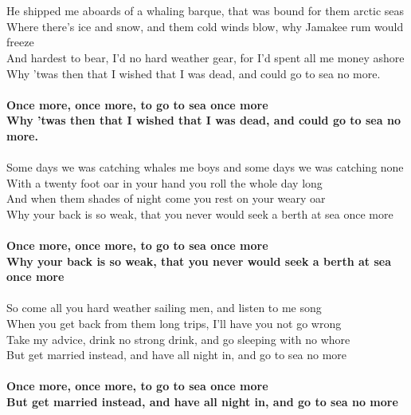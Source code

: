 \documentclass[letterpaper,9pt]{article}
\begin{document}
\\
\\He shipped me aboards of a whaling barque, that was bound for them arctic seas
\\Where there's ice and snow, and them cold winds blow, why Jamakee rum would freeze
\\And hardest to bear, I'd no hard weather gear, for I'd spent all me money ashore
\\Why 'twas then that I wished that I was dead, and could go to sea no more.
\\
\\\textbf{Once more, once more, to go to sea once more
\\Why 'twas then that I wished that I was dead, and could go to sea no more.}
\\
\\Some days we was catching whales me boys and some days we was catching none
\\With a twenty foot oar in your hand you roll the whole day long
\\And when them shades of night come you rest on your weary oar
\\Why your back is so weak, that you never would seek a berth at sea once more
\\
\\\textbf{Once more, once more, to go to sea once more
\\Why your back is so weak, that you never would seek a berth at sea once more}
\\
\\So come all you hard weather sailing men, and listen to me song
\\When you get back from them long trips, I'll have you not go wrong
\\Take my advice, drink no strong drink, and go sleeping with no whore
\\But get married instead, and have all night in, and go to sea no more
\\
\\\textbf{Once more, once more, to go to sea once more
\\But get married instead, and have all night in, and go to sea no more}
\end{document}
